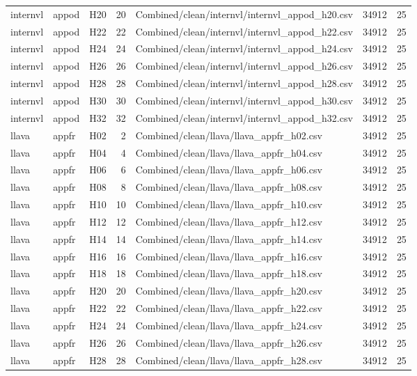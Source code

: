\begin{longtable}{lllrlrr}
internvl & appod & H20 & 20 & Combined/clean/internvl/internvl\_appod\_h20.csv & 34912 & 25 \\
internvl & appod & H22 & 22 & Combined/clean/internvl/internvl\_appod\_h22.csv & 34912 & 25 \\
internvl & appod & H24 & 24 & Combined/clean/internvl/internvl\_appod\_h24.csv & 34912 & 25 \\
internvl & appod & H26 & 26 & Combined/clean/internvl/internvl\_appod\_h26.csv & 34912 & 25 \\
internvl & appod & H28 & 28 & Combined/clean/internvl/internvl\_appod\_h28.csv & 34912 & 25 \\
internvl & appod & H30 & 30 & Combined/clean/internvl/internvl\_appod\_h30.csv & 34912 & 25 \\
internvl & appod & H32 & 32 & Combined/clean/internvl/internvl\_appod\_h32.csv & 34912 & 25 \\
llava & appfr & H02 & 2 & Combined/clean/llava/llava\_appfr\_h02.csv & 34912 & 25 \\
llava & appfr & H04 & 4 & Combined/clean/llava/llava\_appfr\_h04.csv & 34912 & 25 \\
llava & appfr & H06 & 6 & Combined/clean/llava/llava\_appfr\_h06.csv & 34912 & 25 \\
llava & appfr & H08 & 8 & Combined/clean/llava/llava\_appfr\_h08.csv & 34912 & 25 \\
llava & appfr & H10 & 10 & Combined/clean/llava/llava\_appfr\_h10.csv & 34912 & 25 \\
llava & appfr & H12 & 12 & Combined/clean/llava/llava\_appfr\_h12.csv & 34912 & 25 \\
llava & appfr & H14 & 14 & Combined/clean/llava/llava\_appfr\_h14.csv & 34912 & 25 \\
llava & appfr & H16 & 16 & Combined/clean/llava/llava\_appfr\_h16.csv & 34912 & 25 \\
llava & appfr & H18 & 18 & Combined/clean/llava/llava\_appfr\_h18.csv & 34912 & 25 \\
llava & appfr & H20 & 20 & Combined/clean/llava/llava\_appfr\_h20.csv & 34912 & 25 \\
llava & appfr & H22 & 22 & Combined/clean/llava/llava\_appfr\_h22.csv & 34912 & 25 \\
llava & appfr & H24 & 24 & Combined/clean/llava/llava\_appfr\_h24.csv & 34912 & 25 \\
llava & appfr & H26 & 26 & Combined/clean/llava/llava\_appfr\_h26.csv & 34912 & 25 \\
llava & appfr & H28 & 28 & Combined/clean/llava/llava\_appfr\_h28.csv & 34912 & 25 \\

\end{longtable}

